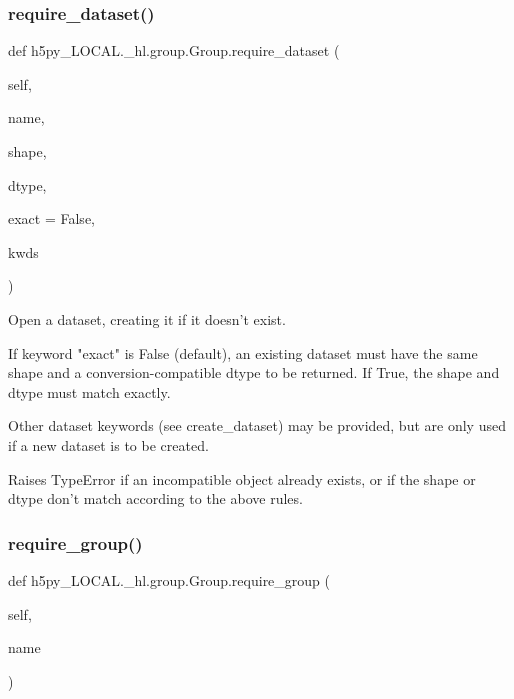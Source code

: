 \subsubsection{\texorpdfstring{require\+\_\+dataset()}{require\_dataset()}}
{\footnotesize\ttfamily def h5py\+\_\+\+L\+O\+C\+A\+L.\+\_\+hl.\+group.\+Group.\+require\+\_\+dataset (\begin{DoxyParamCaption}\item[{}]{self,  }\item[{}]{name,  }\item[{}]{shape,  }\item[{}]{dtype,  }\item[{}]{exact = {\ttfamily False},  }\item[{}]{kwds }\end{DoxyParamCaption})}

\begin{DoxyVerb}Open a dataset, creating it if it doesn't exist.

If keyword "exact" is False (default), an existing dataset must have
the same shape and a conversion-compatible dtype to be returned.  If
True, the shape and dtype must match exactly.

Other dataset keywords (see create_dataset) may be provided, but are
only used if a new dataset is to be created.

Raises TypeError if an incompatible object already exists, or if the
shape or dtype don't match according to the above rules.
\end{DoxyVerb}
 \mbox{\label{classh5py__LOCAL_1_1__hl_1_1group_1_1Group_ae317f8505e87034684c21714fe2d43c1}} 
\subsubsection{\texorpdfstring{require\+\_\+group()}{require\_group()}}
{\footnotesize\ttfamily def h5py\+\_\+\+L\+O\+C\+A\+L.\+\_\+hl.\+group.\+Group.\+require\+\_\+group (\begin{DoxyParamCaption}\item[{}]{self,  }\item[{}]{name }\end{DoxyParamCaption})}

